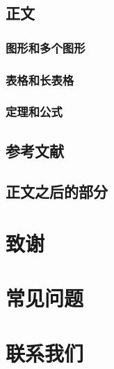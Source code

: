 \documentclass[bachelor]{buaathesis}
\begin{document}
	\section{正文}
		\subsection{图形和多个图形}
		\subsection{表格和长表格}
		\subsection{定理和公式}
	\newpage
	\section{参考文献}
	\section{正文之后的部分}
	
\chapter{致谢}
\cleardoublepage
%

\appendix


\chapter{常见问题}

\chapter{联系我们}
\end{document}

